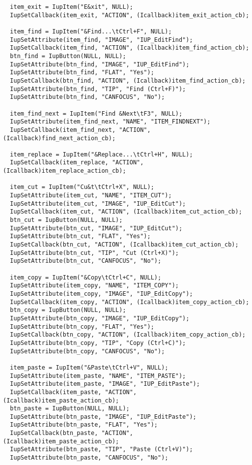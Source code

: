 \documentclass{ctexart}
\begin{document}
\begin{lstlisting}
  item_exit = IupItem("E&xit", NULL);
  IupSetCallback(item_exit, "ACTION", (Icallback)item_exit_action_cb);

  item_find = IupItem("&Find...\tCtrl+F", NULL);
  IupSetAttribute(item_find, "IMAGE", "IUP_EditFind");
  IupSetCallback(item_find, "ACTION", (Icallback)item_find_action_cb);
  btn_find = IupButton(NULL, NULL);
  IupSetAttribute(btn_find, "IMAGE", "IUP_EditFind");
  IupSetAttribute(btn_find, "FLAT", "Yes");
  IupSetCallback(btn_find, "ACTION", (Icallback)item_find_action_cb);
  IupSetAttribute(btn_find, "TIP", "Find (Ctrl+F)");
  IupSetAttribute(btn_find, "CANFOCUS", "No");

  item_find_next = IupItem("Find &Next\tF3", NULL);
  IupSetAttribute(item_find_next, "NAME", "ITEM_FINDNEXT");
  IupSetCallback(item_find_next, "ACTION", (Icallback)find_next_action_cb);

  item_replace = IupItem("&Replace...\tCtrl+H", NULL);
  IupSetCallback(item_replace, "ACTION", (Icallback)item_replace_action_cb);

  item_cut = IupItem("Cu&t\tCtrl+X", NULL);
  IupSetAttribute(item_cut, "NAME", "ITEM_CUT");
  IupSetAttribute(item_cut, "IMAGE", "IUP_EditCut");
  IupSetCallback(item_cut, "ACTION", (Icallback)item_cut_action_cb);
  btn_cut = IupButton(NULL, NULL);
  IupSetAttribute(btn_cut, "IMAGE", "IUP_EditCut");
  IupSetAttribute(btn_cut, "FLAT", "Yes");
  IupSetCallback(btn_cut, "ACTION", (Icallback)item_cut_action_cb);
  IupSetAttribute(btn_cut, "TIP", "Cut (Ctrl+X)");
  IupSetAttribute(btn_cut, "CANFOCUS", "No");

  item_copy = IupItem("&Copy\tCtrl+C", NULL);
  IupSetAttribute(item_copy, "NAME", "ITEM_COPY");
  IupSetAttribute(item_copy, "IMAGE", "IUP_EditCopy");
  IupSetCallback(item_copy, "ACTION", (Icallback)item_copy_action_cb);
  btn_copy = IupButton(NULL, NULL);
  IupSetAttribute(btn_copy, "IMAGE", "IUP_EditCopy");
  IupSetAttribute(btn_copy, "FLAT", "Yes");
  IupSetCallback(btn_copy, "ACTION", (Icallback)item_copy_action_cb);
  IupSetAttribute(btn_copy, "TIP", "Copy (Ctrl+C)");
  IupSetAttribute(btn_copy, "CANFOCUS", "No");

  item_paste = IupItem("&Paste\tCtrl+V", NULL);
  IupSetAttribute(item_paste, "NAME", "ITEM_PASTE");
  IupSetAttribute(item_paste, "IMAGE", "IUP_EditPaste");
  IupSetCallback(item_paste, "ACTION", (Icallback)item_paste_action_cb);
  btn_paste = IupButton(NULL, NULL);
  IupSetAttribute(btn_paste, "IMAGE", "IUP_EditPaste");
  IupSetAttribute(btn_paste, "FLAT", "Yes");
  IupSetCallback(btn_paste, "ACTION", (Icallback)item_paste_action_cb);
  IupSetAttribute(btn_paste, "TIP", "Paste (Ctrl+V)");
  IupSetAttribute(btn_paste, "CANFOCUS", "No");


\end{lstlisting}
\end{document}
